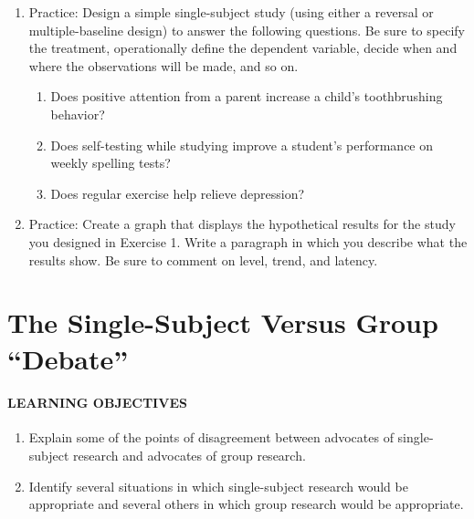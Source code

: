 \documentclass[
]{krantz}
\providecommand{\tightlist}{%
  \setlength{\itemsep}{0pt}\setlength{\parskip}{0pt}}
\begin{document}
\begin{enumerate}
\def\labelenumi{\arabic{enumi}.}
\tightlist
\item
  Practice: Design a simple single-subject study (using either a reversal or multiple-baseline design) to answer the following questions. Be sure to specify the treatment, operationally define the dependent variable, decide when and where the observations will be made, and so on.

  \begin{enumerate}
  \def\labelenumii{\alph{enumii}.}
  \tightlist
  \item
    Does positive attention from a parent increase a child's toothbrushing behavior?
  \item
    Does self-testing while studying improve a student's performance on weekly spelling tests?
  \item
    Does regular exercise help relieve depression?
  \end{enumerate}
\item
  Practice: Create a graph that displays the hypothetical results for the study you designed in Exercise 1. Write a paragraph in which you describe what the results show. Be sure to comment on level, trend, and latency.
\end{enumerate}

\hypertarget{the-single-subject-versus-group-debate}{%
\section{The Single-Subject Versus Group ``Debate''}\label{the-single-subject-versus-group-debate}}

\hypertarget{learning-objectives-29}{%
\paragraph*{LEARNING OBJECTIVES}\label{learning-objectives-29}}

\begin{enumerate}
\def\labelenumi{\arabic{enumi}.}
\tightlist
\item
  Explain some of the points of disagreement between advocates of single-subject research and advocates of group research.
\item
  Identify several situations in which single-subject research would be appropriate and several others in which group research would be appropriate.
\end{enumerate}
\end{document}
